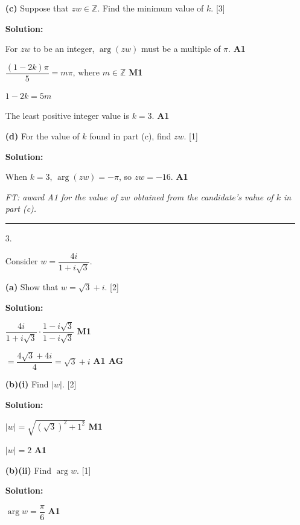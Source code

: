 \documentclass[12pt, twoside]{article}
\begin{document}
\begin{enumerate}[itemsep=0.3cm]
\medskip

\textbf{(c)} Suppose that $zw \in \mathbb{Z}$. Find the minimum value of $k$. \hfill [3]

\textbf{Solution:}

For $zw$ to be an integer, $\arg(zw)$ must be a multiple of $\pi$. \hfill \textbf{A1}

$\dfrac{(1 - 2k)\pi}{5} = m\pi$, where $m \in \mathbb{Z}$ \hfill \textbf{M1}

$1 - 2k = 5m$

The least positive integer value is $k = 3$. \hfill \textbf{A1}

\medskip

\textbf{(d)} For the value of $k$ found in part (c), find $zw$. \hfill [1]

\textbf{Solution:}

When $k = 3$, $\arg(zw) = -\pi$, so $zw = -16$. \hfill \textbf{A1}

\emph{FT: award A1 for the value of $zw$ obtained from the candidate's value of $k$ in part (c).}

\bigskip
\hrule
\bigskip

\item[3.] 

Consider $w = \dfrac{4i}{1 + i\sqrt{3}}$.

\textbf{(a)} Show that $w = \sqrt{3} + i$. \hfill [2]

\textbf{Solution:}

$\dfrac{4i}{1 + i\sqrt{3}} \cdot \dfrac{1 - i\sqrt{3}}{1 - i\sqrt{3}}$ \hfill \textbf{M1}

$= \dfrac{4\sqrt{3} + 4i}{4} = \sqrt{3} + i$ \hfill \textbf{A1 AG}

\medskip

\textbf{(b)(i)} Find $|w|$. \hfill [2]

\textbf{Solution:}

$|w| = \sqrt{(\sqrt{3})^2 + 1^2}$ \hfill \textbf{M1}

$|w| = 2$ \hfill \textbf{A1}

\medskip

\textbf{(b)(ii)} Find $\arg w$. \hfill [1]

\textbf{Solution:}

$\arg w = \dfrac{\pi}{6}$ \hfill \textbf{A1}

\medskip


\end{enumerate}
\end{document}
